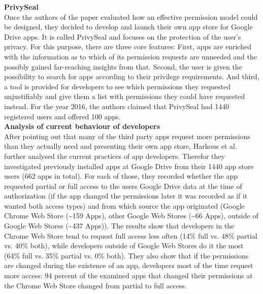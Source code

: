 \documentclass[11pt,twocolumn,a4paper,DIV=calc]{scrartcl}
\begin{document}
\textbf{PrivySeal} \\
Once the authors of the paper evaluated how an effective permission model could be designed, they decided to develop and launch their own app store for Google Drive apps. It is called PrivySeal and focuses on the protection of the user's privacy. For this purpose, there are three core features: First, apps are enriched with the information as to which of its permission requests are unneeded and the possibly gained far-reaching insights from that. Second, the user is given the possibility to search for apps according to their privilege requirements. And third, a tool is provided for developers to see which permissions they requested unjustifiably and give them a list with permissions they could have requested instead. For the year 2016, the authors claimed that PrivySeal had 1440 registered users and offered 100 apps. \\

\textbf{Analysis of current behaviour of developers} \\
After pointing out that many of the third party apps request more permissions than they actually need and presenting their own app store, Harkous et al. further analysed the current practices of app developers. Therefor they investigated previously installed apps at Google Drive from their 1440 app store users (662 apps in total). For each of those, they recorded whether the app requested partial or full access to the users Google Drive data at the time of authorization (if the app changed the permissions later it was recorded as if it wanted both access types) and from which source the app originated (Google Chrome Web Store (\textasciitilde 159 Apps), other Google Web Stores (\textasciitilde 66 Apps), outside of Google Web Stores (\textasciitilde 437 Apps)). The results show that developers in the Chrome Web Store tend to request full access less often (14\% full vs. 48\% partial vs. 40\% both), while developers outside of Google Web Stores do it the most (64\% full vs. 35\% partial vs. 0\% both). They also show that if the permissions are changed during the existence of an app, developers most of the time request more access: 94 percent of the examined apps that changed their permissions at the Chrome Web Store changed from partial to full access. \\ 
\end{document}
